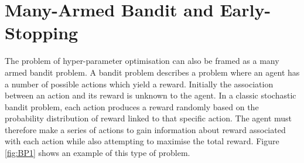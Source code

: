 \newpage
\section {Many-Armed Bandit and Early-Stopping}



	The problem of hyper-parameter optimisation can also be framed as a many armed bandit problem. 
	A bandit problem describes a problem where an agent has a number of possible actions which yield a reward. Initially the association between an action and its reward is unknown to the agent. In a classic stochastic bandit problem, each action produces a reward randomly based on the probability distribution of reward linked to that specific action. The agent must therefore make a series of actions to gain information about reward associated with each action while also attempting to maximise the total reward. Figure \ref{fig:BP1}  shows an example of this type of problem. 


